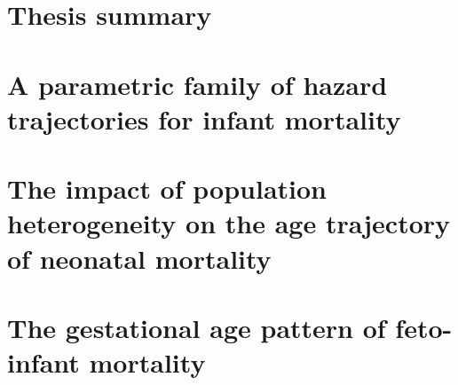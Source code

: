 \documentclass[
  10pt, twoside
]{book}
\begin{document}
% 
% 
% 
% 
% 
% 
% 
% 
% 
% 
% 
% 
% 
% 
% 


\renewcommand{\thechapter}{\Roman{chapter}}

\chapter{Thesis summary}



\chapter{A parametric family of hazard trajectories for infant mortality}



\chapter{The impact of population heterogeneity on the age trajectory of neonatal mortality}



\chapter{The gestational age pattern of feto-infant mortality}


\end{document}
